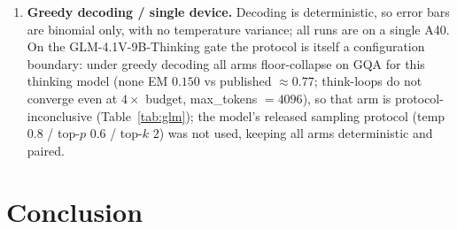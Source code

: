 \documentclass[sigconf,review,anonymous]{acmart}
\begin{document}
\begin{enumerate}
    scorer (query-blind L2) --- the contribution is the stage axis and its
    causal account, not the scorer (\S\ref{sec:negative} shows no decoration
    helps). OCR-Bench skip-scoring is conservative.
  \item \textbf{Greedy decoding / single device.} Decoding is deterministic, so
    error bars are binomial only, with no temperature variance; all runs are on
    a single A40. On the GLM-4.1V-9B-Thinking gate the protocol is itself a
    configuration boundary: under greedy decoding all arms floor-collapse on
    GQA for this thinking model (none EM $0.150$ vs published $\approx 0.77$;
    think-loops do not converge even at $4\times$ budget, max\_tokens $=
    4096$), so that arm is protocol-inconclusive (Table~\ref{tab:glm}); the
    model's released sampling protocol (temp $0.8$ / top-$p$ $0.6$ / top-$k$
    $2$) was not used, keeping all arms deterministic and paired.
\end{enumerate}

\section{Conclusion}\label{sec:conclusion}
\end{document}
